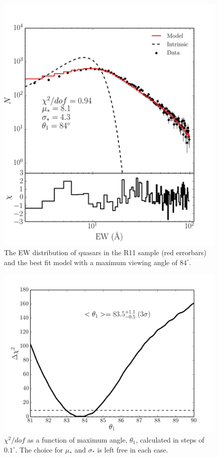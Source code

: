 \begin{figure}
\centering
\includegraphics[width=1.0\textwidth]{figures/ewpaper/log_quasar_fit.png}
\caption
{
The EW distribution of quasars in the R11 sample (red errorbars)
and the best fit model with a maximum viewing angle of
$84^\circ$.
}
\label{fig:chi2}
\end{figure}

\begin{figure}
\centering
\includegraphics[width=1.0\textwidth]{figures/ewpaper/chi2_o3.png}
\caption
{
$\chi^2/dof$ as a function of maximum angle, $\theta_1$, calculated in
steps of $0.1^\circ$. The choice for $\mu_*$ and $\sigma_*$ is 
left free in each case.
}
\label{fig:chi2_curve}
\end{figure}


